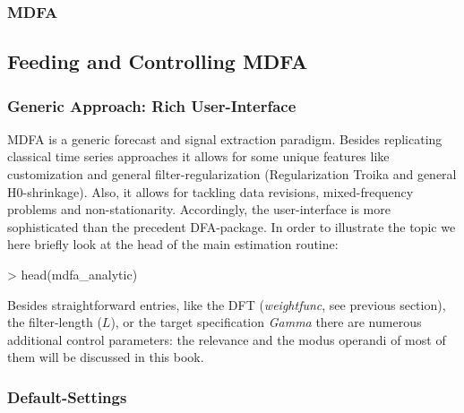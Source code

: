 \documentclass[a4paper]{book}
\begin{document}
\subsubsection{MDFA}


\subsection{Feeding and Controlling MDFA}\label{control_dfa}

\subsubsection{Generic Approach: Rich User-Interface}

MDFA is a generic forecast and signal extraction paradigm. Besides replicating classical time series approaches it allows for some unique features like customization and  general filter-regularization (Regularization Troika and general H0-shrinkage). Also, it allows for tackling data revisions, mixed-frequency problems and non-stationarity. Accordingly, the user-interface is more sophisticated than the precedent DFA-package. In order to illustrate the topic we here briefly look at the head of the main estimation routine:    

\begin{Schunk}
\begin{Sinput}
> head(mdfa_analytic)
\end{Sinput}
\begin{Soutput}
1 function (L, lambda, weight_func, Lag, Gamma, eta, cutoff, i1,             
2     i2, weight_constraint, lambda_cross, lambda_decay, lambda_smooth,      
3     lin_eta, shift_constraint, grand_mean, b0_H0, c_eta, weight_structure, 
4     white_noise, synchronicity, lag_mat, troikaner)                        
5 {                                                                          
6     lambda <- abs(lambda)                                                  
\end{Soutput}
\end{Schunk}
Besides straightforward entries, like the DFT (\emph{weight\textunderscore func}, see previous section), the filter-length ($L$), or the target specification \emph{Gamma} there are numerous additional control parameters: the relevance and the modus operandi of most of them will be discussed in this book. 


\subsubsection{Default-Settings}
\end{document}
